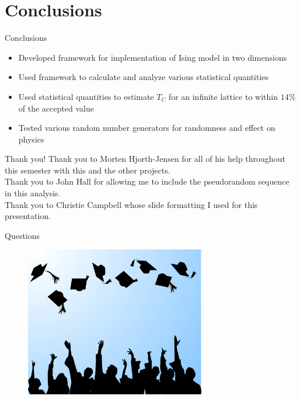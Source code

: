 \documentclass{beamer} %
\begin{document}
\section{Conclusions}

\begin{frame}{Conclusions}
\begin{itemize}
\item Developed framework for implementation of Ising model in two dimensions
\item Used framework to calculate and analyze various statistical quantities
\item Used statistical quantities to estimate $T_{C}$ for an infinite lattice to within $14\%$ of the accepted value
\item Tested various random number generators for randomness and effect on physics
\end{itemize}
\end{frame}

\begin{frame}{Thank you!}
Thank you to Morten Hjorth-Jensen for all of his help throughout this semester with this and the other projects.
\\Thank you to John Hall for allowing me to include the pseudorandom sequence in this analysis.
\\Thank you to Christie Campbell whose slide formatting I used for this presentation.
\end{frame}

\begin{frame}{Questions}
\begin{figure}[h]
\begin{center}
\includegraphics[width=0.7\textwidth]{Graduation}
\end{center}
\end{figure}
\end{frame}



\end{document}
